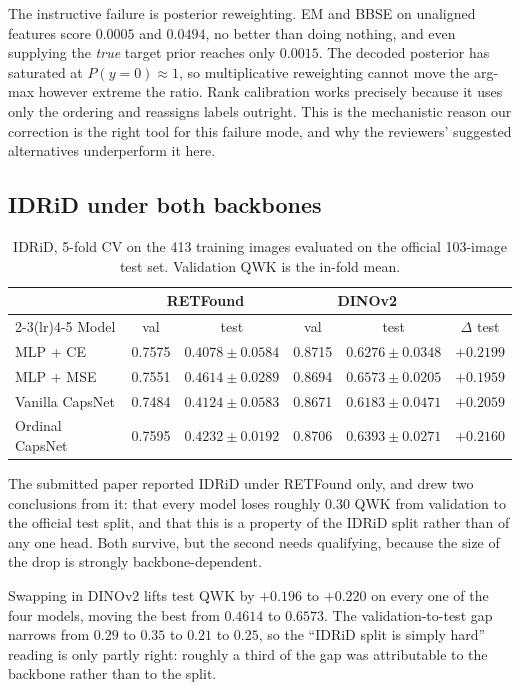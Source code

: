 \documentclass[journal]{IEEEtran}
\begin{document}
The instructive failure is posterior reweighting. EM and BBSE on unaligned features score $0.0005$ and $0.0494$, no better than doing nothing, and even supplying the \emph{true} target prior reaches only $0.0015$. The decoded posterior has saturated at $P(y{=}0) \approx 1$, so multiplicative reweighting cannot move the arg-max however extreme the ratio. Rank calibration works precisely because it uses only the ordering and reassigns labels outright. This is the mechanistic reason our correction is the right tool for this failure mode, and why the reviewers' suggested alternatives underperform it here.

\subsection{IDRiD under both backbones}
\label{sec:idrid-dinov2}
\begin{table}[!t]
\centering
\caption{IDRiD, 5-fold CV on the 413 training images evaluated on the official 103-image test set. Validation QWK is the in-fold mean.}
\label{tab:idrid_backbone}
\begin{tabular}{lccccc}
\toprule
& \multicolumn{2}{c}{RETFound} & \multicolumn{2}{c}{DINOv2} & \\
\cmidrule(lr){2-3}\cmidrule(lr){4-5}
Model & val & test & val & test & $\Delta$ test \\
\midrule
MLP + CE & 0.7575 & $0.4078 \pm 0.0584$ & 0.8715 & $0.6276 \pm 0.0348$ & $+0.2199$ \\
MLP + MSE & 0.7551 & $0.4614 \pm 0.0289$ & 0.8694 & $0.6573 \pm 0.0205$ & $+0.1959$ \\
Vanilla CapsNet & 0.7484 & $0.4124 \pm 0.0583$ & 0.8671 & $0.6183 \pm 0.0471$ & $+0.2059$ \\
Ordinal CapsNet & 0.7595 & $0.4232 \pm 0.0192$ & 0.8706 & $0.6393 \pm 0.0271$ & $+0.2160$ \\
\bottomrule
\end{tabular}
\end{table}

The submitted paper reported IDRiD under RETFound only, and drew two conclusions from it: that every model loses roughly $0.30$ QWK from validation to the official test split, and that this is a property of the IDRiD split rather than of any one head. Both survive, but the second needs qualifying, because the size of the drop is strongly backbone-dependent.

Swapping in DINOv2 lifts test QWK by $+0.196$ to $+0.220$ on every one of the four models, moving the best from $0.4614$ to $0.6573$. The validation-to-test gap narrows from $0.29$ to $0.35$ to $0.21$ to $0.25$, so the ``IDRiD split is simply hard'' reading is only partly right: roughly a third of the gap was attributable to the backbone rather than to the split.
\end{document}
